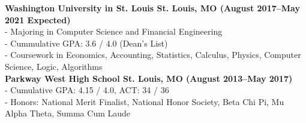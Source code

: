 \documentclass[12pt]{article}
\begin{document}
\begin{titlepage}
\begin{addmargin}[1em]{0em}
			\textbf{Washington University in St. Louis St. Louis, MO \hfill (August 2017–May 2021 Expected)}\\
- Majoring in Computer Science and Financial Engineering\\
- Cummulative GPA: 3.6 / 4.0 (Dean's List)\\
- Coursework in Economics, Accounting, Statistics, Calculus, Physics, Computer Science, Logic, Algorithms\\
			\textbf{Parkway West High School St. Louis, MO \hfill (August 2013–May 2017)}\\
- Cumulative GPA: 4.15 / 4.0, ACT: 34 / 36\\
- Honors: National Merit Finalist, National Honor Society, Beta Chi Pi, Mu Alpha Theta, Summa Cum Laude \\
		\end{addmargin}
	\end{titlepage}
\end{document}
